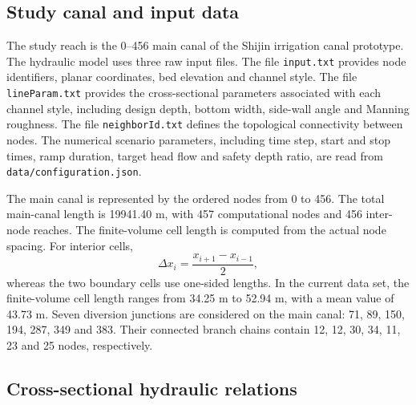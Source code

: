 \subsection{Study canal and input data}

The study reach is the 0--456 main canal of the Shijin irrigation canal
prototype. The hydraulic model uses three raw input files. The file
\texttt{input.txt} provides node identifiers, planar coordinates, bed elevation
and channel style. The file \texttt{lineParam.txt} provides the cross-sectional
parameters associated with each channel style, including design depth, bottom
width, side-wall angle and Manning roughness. The file \texttt{neighborId.txt}
defines the topological connectivity between nodes. The numerical scenario
parameters, including time step, start and stop times, ramp duration, target
head flow and safety depth ratio, are read from
\texttt{data/configuration.json}.

The main canal is represented by the ordered nodes from 0 to 456. The total
main-canal length is 19941.40 m, with 457 computational nodes and 456
inter-node reaches. The finite-volume cell length is computed from the actual
node spacing. For interior cells,
\begin{equation}
    \Delta x_i = \frac{x_{i+1} - x_{i-1}}{2},
\end{equation}
whereas the two boundary cells use one-sided lengths. In the current data set,
the finite-volume cell length ranges from 34.25 m to 52.94 m, with a mean value
of 43.73 m. Seven diversion junctions are considered on the main canal:
71, 89, 150, 194, 287, 349 and 383. Their connected branch chains contain
12, 12, 30, 34, 11, 23 and 25 nodes, respectively.

\subsection{Cross-sectional hydraulic relations}

